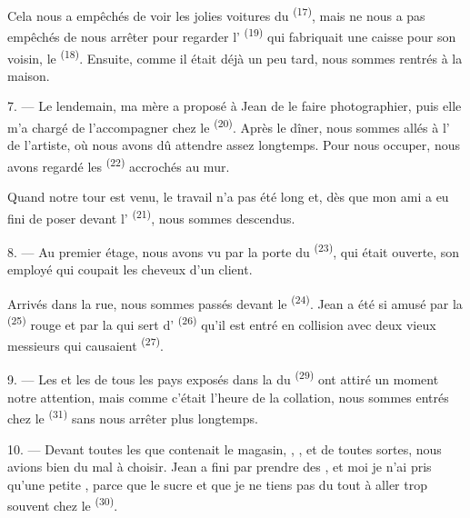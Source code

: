Cela nous a empêchés de voir les jolies voitures du 
\textsuperscript{(17)}, mais ne nous a pas empêchés de nous arrêter pour
regarder l' \textsuperscript{(19)} qui fabriquait une caisse
pour son voisin, le 
\textsuperscript{(18)}. Ensuite, comme il était déjà un peu tard, nous sommes
rentrés à la maison.

\VUsaut{3.0mm}

7. --- Le lendemain, ma mère a proposé à Jean de le faire photographier, puis
elle m'a chargé de l'accompagner chez le 
\textsuperscript{(20)}. Après le dîner, nous sommes allés à l'
de l'artiste, où nous avons dû attendre assez longtemps. Pour nous occuper, nous
avons regardé les  \textsuperscript{(22)} accrochés au mur.

Quand notre tour est venu, le travail n'a pas été long et, dès que mon ami a eu
fini de poser devant l' \textsuperscript{(21)}, nous
sommes descendus.

8. --- Au premier étage, nous avons vu par la porte du 
\textsuperscript{(23)}, qui était ouverte, son employé qui coupait les cheveux
d'un client.

Arrivés dans la rue, nous sommes passés devant le 
\textsuperscript{(24)}. Jean a été si amusé par la 
\textsuperscript{(25)} rouge et par la  qui sert
d' \textsuperscript{(26)} qu'il est entré en collision avec deux
vieux messieurs qui causaient 
\textsuperscript{(27)}.

\VUsaut{3.0mm}

9. --- Les  et les  de tous
les pays exposés dans la  du 
\textsuperscript{(29)} ont attiré un moment notre attention, mais comme c'était
l'heure de la collation, nous sommes entrés chez le 
\textsuperscript{(31)} sans nous arrêter plus longtemps.

10. --- Devant toutes les  que contenait le magasin,
, ,  et 
de toutes sortes, nous avions bien du mal à choisir. Jean a fini par prendre des
, et moi je n'ai pris qu'une petite , parce que le sucre  et que je ne tiens
pas du tout à aller trop souvent chez le  \textsuperscript{(30)}.

